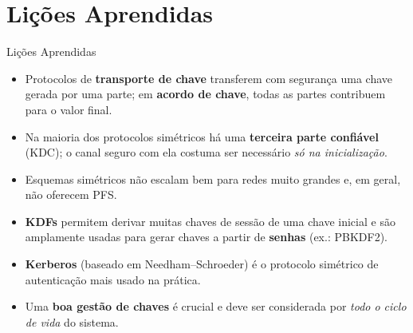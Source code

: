 \documentclass{beamer}
\begin{document}
\section{Lições Aprendidas}

\begin{frame}{Lições Aprendidas}
    \begin{itemize}
        \item Protocolos de \textbf{transporte de chave} transferem com segurança uma chave gerada por uma parte; em \textbf{acordo de chave}, todas as partes contribuem para o valor final.
        \medskip
        \item Na maioria dos protocolos simétricos há uma \textbf{terceira parte confiável} (KDC); o canal seguro com ela costuma ser necessário \emph{só na inicialização}.
        \medskip
        \item Esquemas simétricos \alert{não escalam bem} para redes muito grandes e, em geral, \alert{não oferecem PFS}.
        \medskip
        \item \textbf{KDFs} permitem derivar muitas chaves de sessão de uma chave inicial e são amplamente usadas para gerar chaves a partir de \textbf{senhas} (ex.: PBKDF2).
        \medskip
        \item \textbf{Kerberos} (baseado em Needham--Schroeder) é o protocolo simétrico de autenticação mais usado na prática.
        \medskip
        \item Uma \textbf{boa gestão de chaves} é crucial e deve ser considerada por \emph{todo o ciclo de vida} do sistema.
    \end{itemize}
\end{frame}
\end{document}
